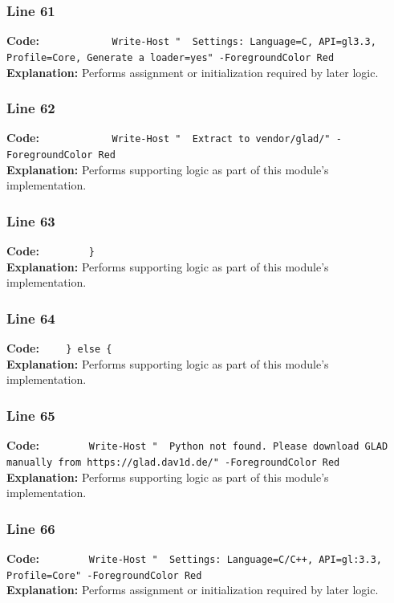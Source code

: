 \documentclass[11pt,a4paper]{article}
\begin{document}
\subsubsection*{Line 61}
\textbf{Code:} \verb|            Write-Host "  Settings: Language=C, API=gl3.3, Profile=Core, Generate a loader=yes" -ForegroundColor Red|\\
\textbf{Explanation:} Performs assignment or initialization required by later logic.

\subsubsection*{Line 62}
\textbf{Code:} \verb|            Write-Host "  Extract to vendor/glad/" -ForegroundColor Red|\\
\textbf{Explanation:} Performs supporting logic as part of this module's implementation.

\subsubsection*{Line 63}
\textbf{Code:} \verb|        }|\\
\textbf{Explanation:} Performs supporting logic as part of this module's implementation.

\subsubsection*{Line 64}
\textbf{Code:} \verb|    } else {|\\
\textbf{Explanation:} Performs supporting logic as part of this module's implementation.

\subsubsection*{Line 65}
\textbf{Code:} \verb|        Write-Host "  Python not found. Please download GLAD manually from https://glad.dav1d.de/" -ForegroundColor Red|\\
\textbf{Explanation:} Performs supporting logic as part of this module's implementation.

\subsubsection*{Line 66}
\textbf{Code:} \verb|        Write-Host "  Settings: Language=C/C++, API=gl:3.3, Profile=Core" -ForegroundColor Red|\\
\textbf{Explanation:} Performs assignment or initialization required by later logic.
\end{document}
